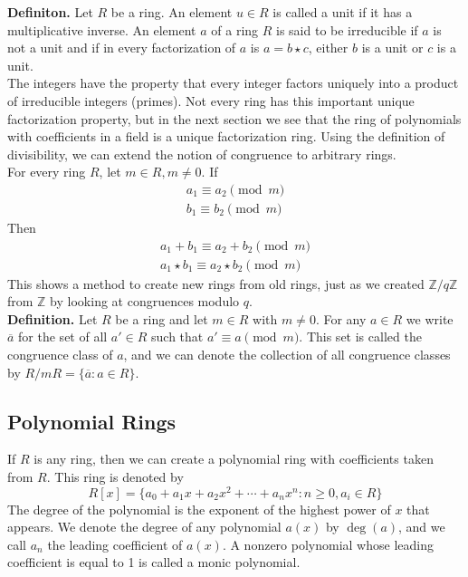 \documentclass{article}
\begin{document}
\noindent \textbf{Definiton.} Let $R$ be a ring. An element $u \in R$ is called a unit if it has a multiplicative inverse. An element $a$ of a ring $R$ is said to be irreducible if $a$ is not a unit and if in every factorization of $a$ is $a = b \star c$, either $b$ is a unit or $c$ is a unit. \\

\noindent The integers have the property that every integer factors uniquely into a product of irreducible integers (primes). Not every ring has this important unique factorization property, but in the next section we see that the ring of polynomials with coefficients in a field is a unique factorization ring. Using the definition of divisibility, we can extend the notion of congruence to arbitrary rings. \\

\noindent For every ring $R$, let $m \in R, m \neq 0$. If
\begin{gather}
    a_1 \equiv a_2 \pmod m \\
    b_1 \equiv b_2 \pmod m
\end{gather}
Then
\begin{gather}
    a_1 + b_1 \equiv a_2 + b_2 \pmod m \\
    a_1 \star b_1 \equiv a_2 \star b_2 \pmod m
\end{gather}
This shows a method to create new rings from old rings, just as we created $\mathbb{Z}/q\mathbb{Z}$ from $\mathbb{Z}$ by looking at congruences modulo $q$. \\

\noindent \textbf{Definition.} Let $R$ be a ring and let $m \in R$ with $m \neq 0$. For any $a \in R$ we write $\overline{a}$ for the set of all $a' \in R$ such that $a' \equiv a \pmod m$. This set is called the congruence class of $a$, and we can denote the collection of all congruence classes by $R/mR = \{\overline{a} : a \in R\}$.

\subsection{Polynomial Rings}
If $R$ is any ring, then we can create a polynomial ring with coefficients taken from $R$. This ring is denoted by 
\begin{equation}
    R[x] = \{a_0 + a_1 x + a_2 x^2 + \cdots + a_n x^n : n \geq 0, a_i \in R\}
\end{equation}
The degree of the polynomial is the exponent of the highest power of $x$ that appears. We denote the degree of any polynomial $a(x)$ by $\deg(a)$, and we call $a_n$ the leading coefficient of $a(x)$. A nonzero polynomial whose leading coefficient is equal to 1 is called a monic polynomial. \\ 
\end{document}
